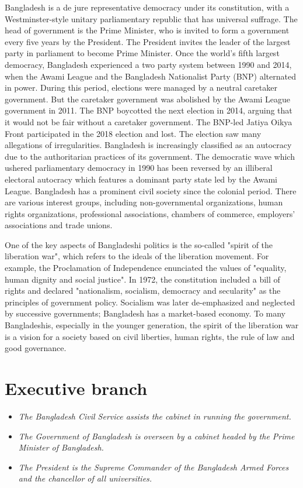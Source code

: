 Bangladesh is a de jure representative democracy under its constitution,
with a Westminster-style unitary parliamentary republic that has
universal suffrage. The head of government is the Prime Minister, who is
invited to form a government every five years by the President. The
President invites the leader of the largest party in parliament to
become Prime Minister. Once the world's fifth largest democracy,
Bangladesh experienced a two party system between 1990 and 2014, when
the Awami League and the Bangladesh Nationalist Party (BNP) alternated
in power. During this period, elections were managed by a neutral
caretaker government. But the caretaker government was abolished by the
Awami League government in 2011. The BNP boycotted the next election in
2014, arguing that it would not be fair without a caretaker government.
The BNP-led Jatiya Oikya Front participated in the 2018 election and
lost. The election saw many allegations of irregularities. Bangladesh is
increasingly classified as an autocracy due to the authoritarian
practices of its government. The democratic wave which ushered
parliamentary democracy in 1990 has been reversed by an illiberal
electoral autocracy which features a dominant party state led by the
Awami League. Bangladesh has a prominent civil society since the
colonial period. There are various interest groups, including
non-governmental organizations, human rights organizations, professional
associations, chambers of commerce, employers' associations and trade
unions.

One of the key aspects of Bangladeshi politics is the so-called "spirit
of the liberation war", which refers to the ideals of the liberation
movement. For example, the Proclamation of Independence enunciated the
values of "equality, human dignity and social justice". In 1972, the
constitution included a bill of rights and declared "nationalism,
socialism, democracy and secularity" as the principles of government
policy. Socialism was later de-emphasized and neglected by successive
governments; Bangladesh has a market-based economy. To many
Bangladeshis, especially in the younger generation, the spirit of the
liberation war is a vision for a society based on civil liberties, human
rights, the rule of law and good governance.

\section{Executive branch}\label{executive-branch}

\begin{itemize}
\item
  \emph{The Bangladesh Civil Service assists the cabinet in running the
  government.}
\item
  \emph{The Government of Bangladesh is overseen by a cabinet headed by
  the Prime Minister of Bangladesh.}
\item
  \emph{The President is the Supreme Commander of the Bangladesh Armed
  Forces and the chancellor of all universities.}
\end{itemize}

